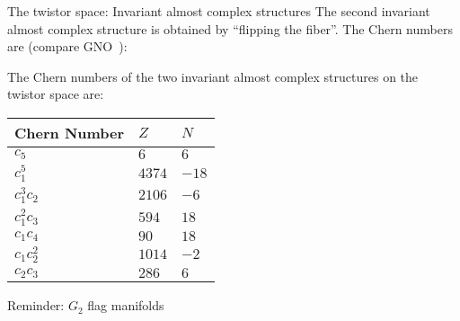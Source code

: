 \documentclass[11pt,parskip]{beamer}
\begin{document}
\begin{frame}{The twistor space: Invariant almost complex structures}
	The second invariant almost complex structure is obtained by ``flipping the fiber''. The Chern numbers are (compare GNO~\cite{GNO2017}):\pause
	\begin{prop}
		The Chern numbers of the two invariant almost complex structures on the twistor space are:\vspace{-0.5cm}
		\begin{table}[ht!]\centering
			\begin{tabular}{lll} \toprule
				Chern Number& $Z$		& $N$ \\ \midrule
				$c_5$ 		& $6$		& $6$ \\
				$c_1^5$ 	& $4374$	& $-18$\\
				$c_1^3c_2$	& $2106$	& $-6$\\
				$c_1^2c_3$	& $594$		& $18$\\
				$c_1c_4$	& $90$		& $18$\\
				$c_1c_2^2$	& $1014$	& $-2$\\
				$c_2c_3$	& $286$		& $6$\\ \bottomrule
			\end{tabular}
		\end{table}
	\end{prop}
\end{frame}

\begin{frame}{Reminder: $G_2$ flag manifolds}
	\begin{figure}\centering
	\end{figure}
\end{frame}
\end{document}
